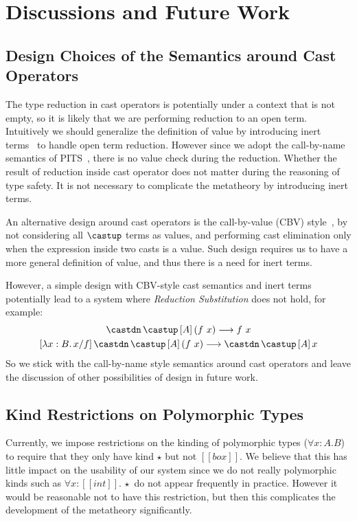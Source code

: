 \section{Discussions and Future Work}

\subsection{Design Choices of the Semantics around Cast Operators}
\label{sec:cast-design}

The type reduction in cast operators is potentially under a context that
is not empty, so it is likely that we are performing reduction to an open term.
Intuitively we should generalize the definition of value by introducing inert
terms~\cite{yang2017unifying} to handle open term reduction.
However since we adopt the call-by-name semantics of PITS~\cite{yang2019pure},
there is no value check during the reduction. Whether the result of reduction
inside cast operator does not matter during the reasoning of type safety. It is
not necessary to complicate the metatheory by introducing inert terms.

An alternative design
around cast operators is the call-by-value (CBV) style~\cite{yang2019pure},
by not considering all $\castup$ terms as values, and performing cast elimination only
when the expression inside two casts is a value. Such design requires us to
have a more general definition of value, and thus there is a need for inert terms.

However, a simple design with CBV-style cast semantics and inert terms
potentially lead to a system where \emph{Reduction Substitution} does not hold,
for example:
\begin{gather*}
    \castdn \, \castup \, [A] \, (f ~ x) \longrightarrow f ~ x \\
    [\lambda x : B. \, x / f] \, \castdn \, \castup \, [A] \, (f ~ x) \longrightarrow \castdn \, \castup \, [A] \, x
\end{gather*}
So we stick with the call-by-name style semantics around cast operators and
leave the discussion of other possibilities of design in future work.

\subsection{Kind Restrictions on Polymorphic Types}

Currently, we impose restrictions on the kinding of polymorphic types
($\forall x : A. B$) to require that they only have kind $\star$ but not $[[box]]$.
We believe that this has little impact on the usability
of our system since we do not really polymorphic
kinds such as $\forall x : [[int]].\,\star$ do not appear frequently in practice.
However it would be reasonable not to have this restriction, but then
this complicates the development of the metatheory significantly.

